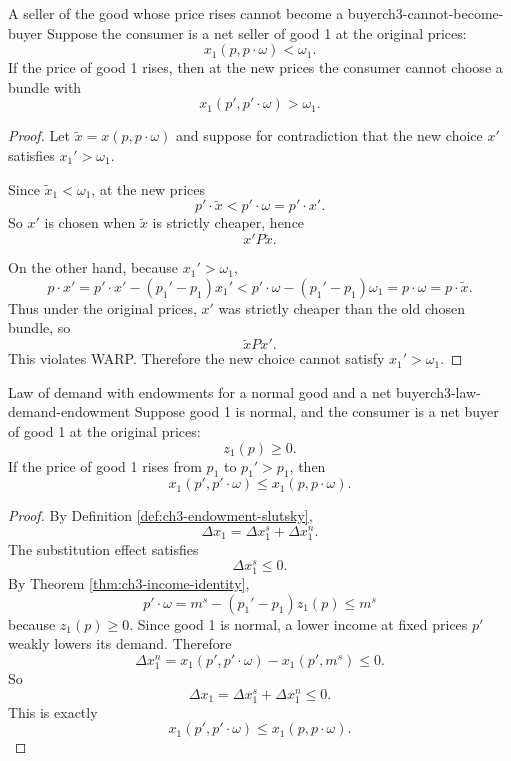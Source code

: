 \begin{theorem}{A seller of the good whose price rises cannot become a buyer}{ch3-cannot-become-buyer}
Suppose the consumer is a net seller of good 1 at the original prices:
\[
x_1(p,p\cdot \omega)<\omega_1.
\]
If the price of good 1 rises, then at the new prices the consumer cannot choose a bundle with
\[
x_1(p',p'\cdot \omega)>\omega_1.
\]
\end{theorem}

\begin{proof}
Let $\tilde x=x(p,p\cdot \omega)$ and suppose for contradiction that the new choice $x'$ satisfies $x_1'>\omega_1$.

Since $\tilde x_1<\omega_1$, at the new prices
\[
p'\cdot \tilde x < p'\cdot \omega = p'\cdot x'.
\]
So $x'$ is chosen when $\tilde x$ is strictly cheaper, hence
\[
x' P \tilde x.
\]

On the other hand, because $x_1'>\omega_1$,
\[
p\cdot x' = p'\cdot x' - (p_1'-p_1)x_1'
< p'\cdot \omega - (p_1'-p_1)\omega_1
= p\cdot \omega
= p\cdot \tilde x.
\]
Thus under the original prices, $x'$ was strictly cheaper than the old chosen bundle, so
\[
\tilde x P x'.
\]
This violates WARP. Therefore the new choice cannot satisfy $x_1'>\omega_1$.
\end{proof}

\begin{theorem}{Law of demand with endowments for a normal good and a net buyer}{ch3-law-demand-endowment}
Suppose good 1 is normal, and the consumer is a net buyer of good 1 at the original prices:
\[
z_1(p)\ge 0.
\]
If the price of good 1 rises from $p_1$ to $p_1' > p_1$, then
\[
x_1(p',p'\cdot \omega)\le x_1(p,p\cdot \omega).
\]
\end{theorem}

\begin{proof}
By Definition \ref{def:ch3-endowment-slutsky},
\[
\Delta x_1=\Delta x_1^s+\Delta x_1^n.
\]
The substitution effect satisfies
\[
\Delta x_1^s\le 0.
\]
By Theorem \ref{thm:ch3-income-identity},
\[
p'\cdot \omega = m^s-(p_1'-p_1)z_1(p)\le m^s
\]
because $z_1(p)\ge 0$. Since good 1 is normal, a lower income at fixed prices $p'$ weakly lowers its demand. Therefore
\[
\Delta x_1^n = x_1(p',p'\cdot \omega)-x_1(p',m^s)\le 0.
\]
So
\[
\Delta x_1=\Delta x_1^s+\Delta x_1^n\le 0.
\]
This is exactly
\[
x_1(p',p'\cdot \omega)\le x_1(p,p\cdot \omega).
\]
\end{proof}

